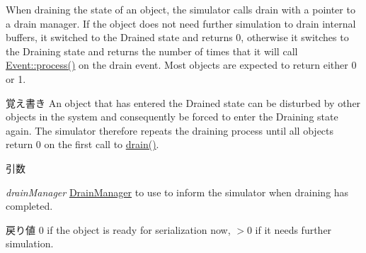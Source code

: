 When draining the state of an object, the simulator calls drain with a pointer to a drain manager. If the object does not need further simulation to drain internal buffers, it switched to the Drained state and returns 0, otherwise it switches to the Draining state and returns the number of times that it will call \hyperlink{classEvent_a142b75b68a6291400e20fb0dd905b1c8}{Event::process()} on the drain event. Most objects are expected to return either 0 or 1.

\begin{DoxyNote}{覚え書き}
An object that has entered the Drained state can be disturbed by other objects in the system and consequently be forced to enter the Draining state again. The simulator therefore repeats the draining process until all objects return 0 on the first call to \hyperlink{classDrainable_a1ed42c14f2f622ea6b0df3865e89c8b4}{drain()}.
\end{DoxyNote}

\begin{DoxyParams}{引数}
\item[{\em drainManager}]\hyperlink{classDrainManager}{DrainManager} to use to inform the simulator when draining has completed.\end{DoxyParams}
\begin{DoxyReturn}{戻り値}
0 if the object is ready for serialization now, $>$0 if it needs further simulation. 
\end{DoxyReturn}


